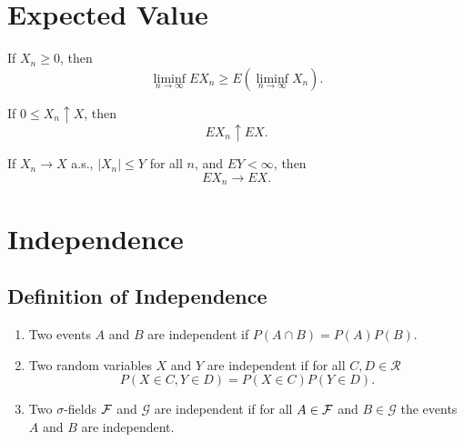 \section{Expected Value}

\begin{definition}[Expectation]\label{def:expectation}

\end{definition}

\begin{theorem}\label{thm:bounded-convergence-theorem}

\end{theorem}

\begin{theorem}\label{thm:fatou-lemma}
	If \(X_n \geq 0\), then
	\begin{equation}
		\liminf _{n \rightarrow \infty} E X_{n} \geq E\left(\liminf _{n \rightarrow \infty} X_{n}\right).
	\end{equation}
\end{theorem}

\begin{theorem}\label{thm:monotone-convergence}
	If \(0 \leq X_{n} \uparrow X\), then
	\begin{equation}
		E X_{n} \uparrow E X.
	\end{equation}
\end{theorem}

\begin{theorem}\label{thm:dominated-convergence}
	If \(X_{n} \rightarrow X\) a.s., \(\left|X_{n}\right| \leq Y\) for all \(n\), and \(E Y<\infty\), then
	\begin{equation}
		E X_{n} \rightarrow E X.
	\end{equation}
\end{theorem}

\section{Independence}

\subsection{Definition of Independence}

\begin{definition}[Independence]
	\begin{enumerate}
		\item Two events \(A\) and \(B\) are independent if \(P(A \cap B)=P(A) P(B)\).
		\item Two random variables \(X\) and \(Y\) are independent if for all \(C,D\in\mathcal{R}\)
		      \begin{equation}
			      P(X\in C,Y\in D)=P(X\in C)P(Y\in D).
		      \end{equation}
		\item Two \(\sigma\)-fields \(\mathcal{F}\) and \(\mathcal{G}\) are independent if for all \(A\in\mathcal{F}\) and \(B\in\mathcal{G}\) the events \(A\) and \(B\) are independent.
	\end{enumerate}
\end{definition}

